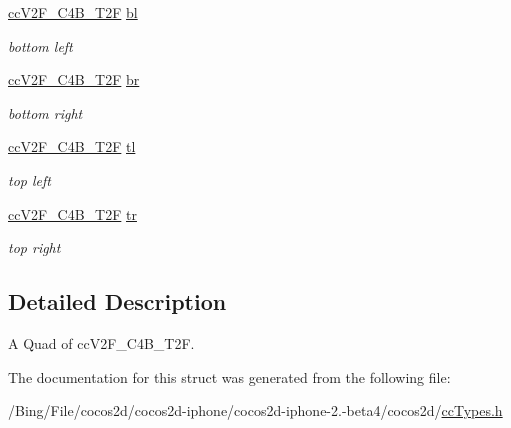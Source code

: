 \begin{DoxyCompactItemize}
\item 
\hypertarget{struct__cc_v2_f___c4_b___t2_f___quad_a02c900b10f2ef26ccd094ef2db4761d4}{\hyperlink{cc_types_8h_aa3f3456208d3090768d2c9bff64412ac}{cc\-V2\-F\-\_\-\-C4\-B\-\_\-\-T2\-F} \hyperlink{struct__cc_v2_f___c4_b___t2_f___quad_a02c900b10f2ef26ccd094ef2db4761d4}{bl}}\label{struct__cc_v2_f___c4_b___t2_f___quad_a02c900b10f2ef26ccd094ef2db4761d4}

\begin{DoxyCompactList}\small\item\em bottom left \end{DoxyCompactList}\item 
\hypertarget{struct__cc_v2_f___c4_b___t2_f___quad_a598ad26ac9418b554e00ba73d2ae60d5}{\hyperlink{cc_types_8h_aa3f3456208d3090768d2c9bff64412ac}{cc\-V2\-F\-\_\-\-C4\-B\-\_\-\-T2\-F} \hyperlink{struct__cc_v2_f___c4_b___t2_f___quad_a598ad26ac9418b554e00ba73d2ae60d5}{br}}\label{struct__cc_v2_f___c4_b___t2_f___quad_a598ad26ac9418b554e00ba73d2ae60d5}

\begin{DoxyCompactList}\small\item\em bottom right \end{DoxyCompactList}\item 
\hypertarget{struct__cc_v2_f___c4_b___t2_f___quad_a26a1e0afb6cf474918b5ce137c499b8a}{\hyperlink{cc_types_8h_aa3f3456208d3090768d2c9bff64412ac}{cc\-V2\-F\-\_\-\-C4\-B\-\_\-\-T2\-F} \hyperlink{struct__cc_v2_f___c4_b___t2_f___quad_a26a1e0afb6cf474918b5ce137c499b8a}{tl}}\label{struct__cc_v2_f___c4_b___t2_f___quad_a26a1e0afb6cf474918b5ce137c499b8a}

\begin{DoxyCompactList}\small\item\em top left \end{DoxyCompactList}\item 
\hypertarget{struct__cc_v2_f___c4_b___t2_f___quad_ac1fdf89b356fe28c036c1475ea1fa8c2}{\hyperlink{cc_types_8h_aa3f3456208d3090768d2c9bff64412ac}{cc\-V2\-F\-\_\-\-C4\-B\-\_\-\-T2\-F} \hyperlink{struct__cc_v2_f___c4_b___t2_f___quad_ac1fdf89b356fe28c036c1475ea1fa8c2}{tr}}\label{struct__cc_v2_f___c4_b___t2_f___quad_ac1fdf89b356fe28c036c1475ea1fa8c2}

\begin{DoxyCompactList}\small\item\em top right \end{DoxyCompactList}\end{DoxyCompactItemize}


\subsection{Detailed Description}
A Quad of cc\-V2\-F\-\_\-\-C4\-B\-\_\-\-T2\-F. 

The documentation for this struct was generated from the following file\-:\begin{DoxyCompactItemize}
\item 
/\-Bing/\-File/cocos2d/cocos2d-\/iphone/cocos2d-\/iphone-\/2.-\/beta4/cocos2d/\hyperlink{cc_types_8h}{cc\-Types.\-h}\end{DoxyCompactItemize}
